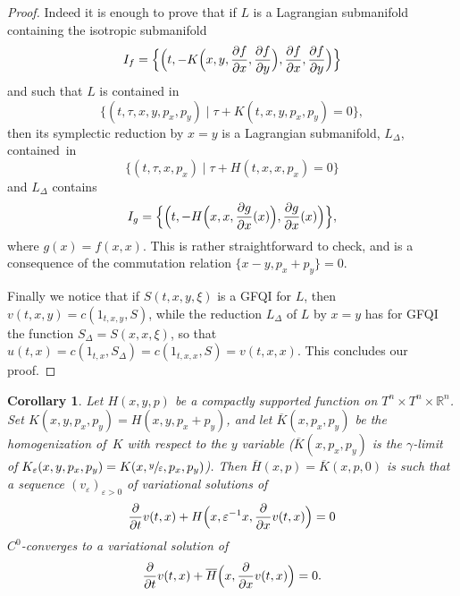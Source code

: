 \documentclass[JEP,XML,SOM,NoFloatCountersInSection,Unicode,published]{cedram}
\numberwithin{equation}{section}
\newcommand{\GFQI}{\textup{GFQI}\xspace}
\theoremstyle{plain}
\newtheorem{corollary}[theorem]{Corollary}
\theoremstyle{definition}
\theoremstyle{remark}
\begin{document}
\begin{proof}
Indeed it is enough to prove that if $L$ is a Lagrangian submanifold containing the isotropic submanifold
\[
I_f=\Bigl\{\Bigl(t,-K\Bigl(x,y,\frac{\partial f}{\partial x},\frac{\partial f}{\partial y}\Bigr), \frac{\partial f}{\partial x},\frac{\partial f}{\partial y}\Bigr)\Bigr\}
\]
and such that $L$ is contained in
\[
\{(t,\tau, x,y, p_x,p_y) \mid \tau +K(t,x,y,p_x,p_y)=0\},
\]
then its symplectic reduction by $x\!=\!y$ is a Lagrangian submanifold, $L_{\Delta}$, contained~in
\[
\{(t,\tau, x, p_x) \mid \tau +H(t,x,x,p_x)=0\}
\]
and $L_{\Delta}$ contains
\[
I_g=\Bigl \{\Bigl(t,-H\Bigl(x,x,\frac{\partial g}{\partial x}(x)\Bigr), \frac{\partial g}{\partial x}(x)\Bigr) \Bigr \},
\]
where $g(x)=f(x,x)$.
This is rather straightforward to check, and is a consequence of the commutation relation $\{x-y,p_x + p_y\}=0$.

Finally we notice that if $S(t,x,y,\xi)$ is a \GFQI for $L$, then $v(t,x,y)=c(1_{t,x,y},S)$, while the reduction $L_{\Delta}$ of $L$ by $x=y$ has
for \GFQI the function $S_{\Delta}=S(x,x,\xi)$, so that $u(t,x)=c(1_{t,x},S_{\Delta})=c(1_{t,x,x},S)=v(t,x,x)$. This concludes our proof.
\end{proof}

\begin{corollary}
Let $H(x,y,p)$ be a compactly supported function on $T^n\!\times\! T^n \!\times\! {\mathbb R}^n$. Set $K(x,y,p_x,p_y)=H(x,y,p_x+p_y)$, and let
$\overline K (x,p_x,p_y)$ be the homogenization of~$K$ with respect to the $y$ variable (\ie $\overline K (x,p_x,p_y)$ is the
$\gamma$-limit of $K_{\varepsilon}(x,y,p_x,p_y)=K(x,\sfrac{y}{\varepsilon},p_x,p_y)$). Then $\overline H(x,p)=\overline K(x,p,0)$
is such that a sequence $(v_{ \varepsilon })_{ \varepsilon >0}$ of variational solutions of
\[
\frac{\partial}{\partial t} v (t,x) + H \Bigl(x, {\varepsilon}^{-1} x, \frac{\partial}{\partial x}v (t,x)\Bigr) = 0
\]
$C^{0}$-converges to a variational solution of
\[
\frac{\partial}{\partial t} v (t,x) + {\overline H} \Bigl(x, \frac{\partial}{\partial x}v (t,x)\Bigr) = 0.
\]
\end{corollary}
\end{document}

